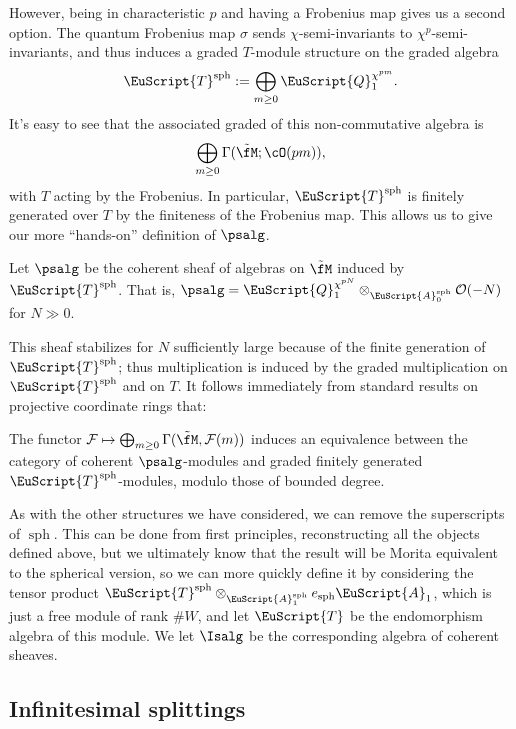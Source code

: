 However, being in characteristic $p$ and having a Frobenius map gives us a second option.  The quantum Frobenius map $\sigma$ sends $\chi$-semi-invariants to $\chi^p$-semi-invariants, and thus induces a graded $T$-module structure on the graded algebra \[\EuScript{T}^{\operatorname{sph}}:=\bigoplus_{m\geq 0}\EuScript{Q}_1^{\chi^{pm}}.\]
It's easy to see that the associated graded of this non-commutative algebra is \[\bigoplus_{m\geq 0}\Gamma(\tilde{\fM};\cO(pm)),\] with $T$ acting by the Frobenius. In particular, $\EuScript{T}^{\operatorname{sph}}$ is finitely generated over $T$ by the finiteness of the Frobenius map.
This allows us to give our more ``hands-on'' definition of $\psalg$.
\begin{definition}
 Let $\psalg$ be the coherent sheaf of algebras on $\tilde{\fM}$ induced by $\EuScript{T}^{\operatorname{sph}}$.  That is, $\psalg=\EuScript{Q}_1^{\chi^{pN}}\otimes_{\EuScript{A}_0^{\operatorname{sph}}}\mathcal{O}(-N)$ for $N\gg 0$.  
\end{definition}
This sheaf stabilizes for $N$ sufficiently large because of the finite generation of $\EuScript{T}^{\operatorname{sph}}$; thus multiplication is induced by the graded multiplication on $\EuScript{T}^{\operatorname{sph}}$ and on $T$.   It follows immediately from standard results on projective coordinate rings that:
\begin{corollary}
  The functor $\mathcal{F}\mapsto \bigoplus_{m\geq 0}\Gamma(\tilde{\fM},\mathcal{F}(m))$ induces an equivalence between the category of coherent $\psalg$-modules and graded finitely generated $\EuScript{T}^{\operatorname{sph}}$-modules, modulo those of bounded degree.
\end{corollary}
As with the other structures we have considered, we can remove the superscripts of $\operatorname{sph}$.  This can be done from first principles, reconstructing all the objects defined above, but we ultimately know that the result will be Morita equivalent to the spherical version, so we can more quickly define it by considering the tensor product $\EuScript{T}^{\operatorname{sph}}\otimes_{\EuScript{A}_1^{\operatorname{sph}}}e_{\operatorname{sph}}\EuScript{A}_1$, which is just a free module of rank $\#W$, and let $\EuScript{T}$ be the endomorphism algebra of this module.  We let $\Isalg$ be the corresponding algebra of coherent sheaves.  



\subsection{Infinitesimal splittings}

